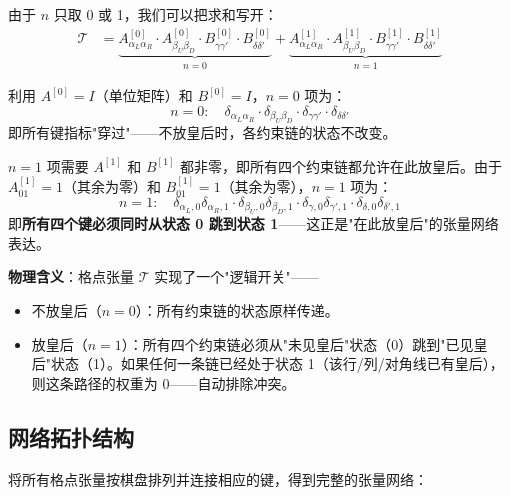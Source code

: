 \documentclass[12pt,a4paper]{ctexart}
\begin{document}
由于 $n$ 只取 0 或 1，我们可以把求和写开：
\begin{align}
\mathcal{T} &= \underbrace{A^{[0]}_{\alpha_L \alpha_R} \cdot A^{[0]}_{\beta_U \beta_D} \cdot B^{[0]}_{\gamma\gamma'} \cdot B^{[0]}_{\delta\delta'}}_{n=0} + \underbrace{A^{[1]}_{\alpha_L \alpha_R} \cdot A^{[1]}_{\beta_U \beta_D} \cdot B^{[1]}_{\gamma\gamma'} \cdot B^{[1]}_{\delta\delta'}}_{n=1}
\end{align}

利用 $A^{[0]} = I$（单位矩阵）和 $B^{[0]} = I$，$n = 0$ 项为：
\[
n=0: \quad \delta_{\alpha_L \alpha_R} \cdot \delta_{\beta_U \beta_D} \cdot \delta_{\gamma\gamma'} \cdot \delta_{\delta\delta'}
\]
即所有键指标"穿过"——不放皇后时，各约束链的状态不改变。

$n = 1$ 项需要 $A^{[1]}$ 和 $B^{[1]}$ 都非零，即所有四个约束链都允许在此放皇后。由于 $A^{[1]}_{01} = 1$（其余为零）和 $B^{[1]}_{01} = 1$（其余为零），$n=1$ 项为：
\[
n=1: \quad \delta_{\alpha_L,0}\delta_{\alpha_R,1} \cdot \delta_{\beta_U,0}\delta_{\beta_D,1} \cdot \delta_{\gamma,0}\delta_{\gamma',1} \cdot \delta_{\delta,0}\delta_{\delta',1}
\]
即\textbf{所有四个键必须同时从状态 0 跳到状态 1}——这正是"在此放皇后"的张量网络表达。

\textbf{物理含义}：格点张量 $\mathcal{T}$ 实现了一个"逻辑开关"——
\begin{itemize}
    \item 不放皇后（$n=0$）：所有约束链的状态原样传递。
    \item 放皇后（$n=1$）：所有四个约束链必须从"未见皇后"状态（0）跳到"已见皇后"状态（1）。如果任何一条链已经处于状态 1（该行/列/对角线已有皇后），则这条路径的权重为 0——自动排除冲突。
\end{itemize}

\subsection{网络拓扑结构}

将所有格点张量按棋盘排列并连接相应的键，得到完整的张量网络：
\end{document}
